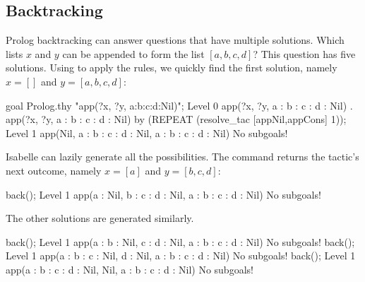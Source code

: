 \subsection{Backtracking}
Prolog backtracking can answer questions that have multiple solutions.
Which lists $x$ and $y$ can be appended to form the list $[a,b,c,d]$?  This
question has five solutions.  Using  to apply the rules, we
quickly find the first solution, namely $x=[]$ and $y=[a,b,c,d]$:
\begin{ttbox}
goal Prolog.thy "app(?x, ?y, a:b:c:d:Nil)";
{\out Level 0}
{\out app(?x, ?y, a : b : c : d : Nil)}
{. app(?x, ?y, a : b : c : d : Nil)}
\ttbreak
by (REPEAT (resolve_tac [appNil,appCons] 1));
{\out Level 1}
{\out app(Nil, a : b : c : d : Nil, a : b : c : d : Nil)}
{\out No subgoals!}
\end{ttbox}
Isabelle can lazily generate all the possibilities.  The 
command returns the tactic's next outcome, namely $x=[a]$ and $y=[b,c,d]$:
\begin{ttbox}
back();
{\out Level 1}
{\out app(a : Nil, b : c : d : Nil, a : b : c : d : Nil)}
{\out No subgoals!}
\end{ttbox}
The other solutions are generated similarly.
\begin{ttbox}
back();
{\out Level 1}
{\out app(a : b : Nil, c : d : Nil, a : b : c : d : Nil)}
{\out No subgoals!}
\ttbreak
back();
{\out Level 1}
{\out app(a : b : c : Nil, d : Nil, a : b : c : d : Nil)}
{\out No subgoals!}
\ttbreak
back();
{\out Level 1}
{\out app(a : b : c : d : Nil, Nil, a : b : c : d : Nil)}
{\out No subgoals!}
\end{ttbox}


